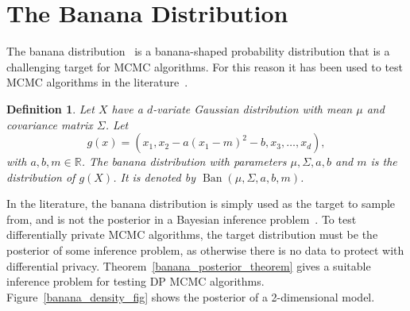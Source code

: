 \documentclass[english,twoside,openright]{HYgraduMLDS}
\newtheorem{definition}{Definition}
\newcommand{\R}{\mathbb{R}}
\DeclareMathOperator{\ban}{Ban}
\begin{document}
\section{The Banana Distribution}

The banana distribution~\cite{TPK14} is a banana-shaped probability 
distribution that is a challenging target for MCMC algorithms. For this reason it has 
been used to test MCMC algorithms in the literature~\cite{TPK14}. 

\begin{definition}
    Let \(X\) have a \(d\)-variate Gaussian distribution with
    mean \(\mu\) and covariance matrix \(\Sigma\). Let
    \[
        g(x) = (x_1, x_2 - a(x_1 - m)^2 - b, x_3, \dotsc, x_d),
    \]
    with \(a, b, m \in \R\).
    The banana distribution with parameters \(\mu, \Sigma, a, b\) and \(m\)
    is the distribution of \(g(X)\). It is denoted by 
    \(\ban(\mu, \Sigma, a, b, m)\).
\end{definition}

In the literature, the banana distribution is simply used as the target to 
sample from, and is not the posterior in a Bayesian inference 
problem~\cite{TPK14}. To test differentially private MCMC algorithms, the 
target distribution must be the posterior of some inference problem, as 
otherwise there is no data to protect with differential privacy.
Theorem~\ref{banana_posterior_theorem} gives a suitable inference problem 
for testing DP MCMC algorithms.
Figure~\ref{banana_density_fig} shows the posterior of a 2-dimensional model.
\end{document}
